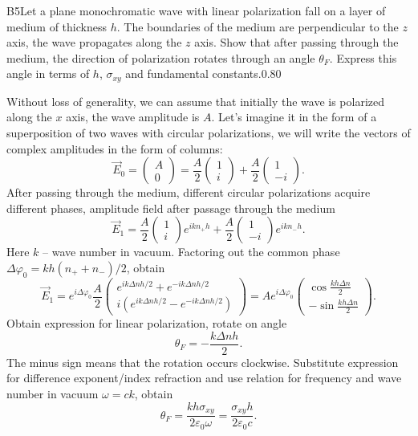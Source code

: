 \documentclass[11pt,a4paper]{article}
\begin{document}
\begin{solcard}{B5}{Let a plane monochromatic wave with linear polarization fall on a layer of medium of thickness $h$. The boundaries of the medium are perpendicular to the $z$ axis, the wave propagates along the $z$ axis. Show that after passing through the medium, the direction of polarization rotates through an angle $\theta_F$. Express this angle in terms of $h$, $\sigma_{xy}$ and fundamental constants.}{0.80}

Without loss of generality, we can assume that initially the wave is polarized along the $x$ axis, the wave amplitude is $A$. Let's imagine it in the form of a superposition of two waves with circular polarizations, we will write the vectors of complex amplitudes in the form of columns: $$ \vec{E}_{0} = \begin{pmatrix} A \\ 0\end{pmatrix} = \frac{A}{2} \begin{pmatrix} 1 \\ i \end{pmatrix} + \frac{A}{2} \begin{pmatrix} 1 \\ -i \end{pmatrix}. $$After passing through the medium, different circular polarizations acquire different phases, amplitude field after passage through the medium $$ \vec{E}_1 = \frac{A}{2} \begin{pmatrix} 1 \\ i \end{pmatrix} e^{i k n_+ h}+ \frac{A}{2} \begin{pmatrix} 1 \\ -i \end{pmatrix} e^{i k n_- h}. $$Here $k$ – wave number in vacuum. Factoring out the common phase $\Delta \varphi_0 = kh (n_+ + n_-)/2$, obtain $$ \vec{E}_1 = e^{i \Delta \varphi_0} \frac{A}{2} \begin{pmatrix} e^{i k \Delta n h/2} +  e^{-i k \Delta n h/2}\\ i (e^{i k \Delta n h/2} -  e^{-i k \Delta n h/2})\end{pmatrix} = A e^{i \Delta \varphi_0} \begin{pmatrix} \cos \frac{k h \Delta n}{2} \\ - \sin\frac{k h \Delta n}{2} \end{pmatrix}. $$Obtain expression for linear polarization, rotate on angle $$ \theta_F = - \frac{k \Delta n h}{2}. $$The minus sign means that the rotation occurs clockwise. Substitute expression for difference exponent/index refraction and use relation for frequency and wave number in vacuum $\omega = c k$, obtain $$ \theta_F = \frac{k h \sigma_{xy}}{2 \varepsilon_0 \omega} = \frac{\sigma_{xy} h}{2 \varepsilon_0 c}. $$



\end{solcard}
\end{document}
